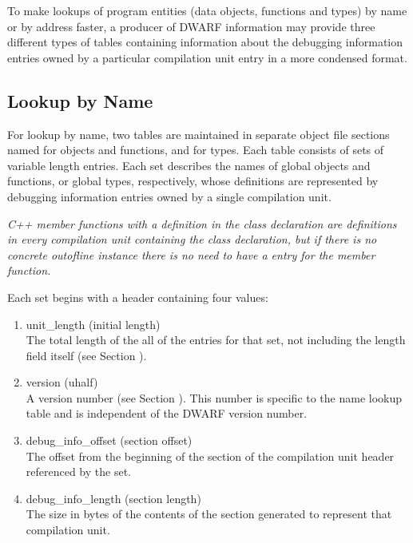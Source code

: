 To make lookups of program entities (data objects, functions
and types) by name or by address faster, a producer of DWARF
information may provide three different types of tables
containing information about the debugging information
entries owned by a particular compilation unit entry in a
more condensed format.

\subsection{Lookup by Name}

For lookup by name, 
two tables are maintained in separate
object file sections named 
 for objects and
functions, and 
for types. Each table consists
of sets of variable length entries. Each set describes the
names of global objects and functions, or global types,
respectively, whose definitions are represented by debugging
information entries owned by a single compilation unit.

\textit{C++ member functions with a definition in the class declaration
are definitions in every compilation unit containing the
class declaration, but if there is no concrete out\dash of\dash line
instance there is no need to have a 
 entry
for the member function.}

Each set begins with a header containing four values:
\begin{enumerate}[1.]

\item unit\_length (initial length) \\
The total length of the all of the entries for that set,
not including the length field itself 
(see Section ).

\item  version (uhalf) \\
A version number 
(see Section ). 
This number is specific
to the name lookup table and is independent of the DWARF
version number.

\item debug\_info\_offset (section offset) \\
The offset from the beginning of the 
 section of
the compilation unit header referenced by the set.

\item debug\_info\_length (section length) \\
The size in bytes of the contents of the 
 section
generated to represent that compilation unit.
\end{enumerate}

